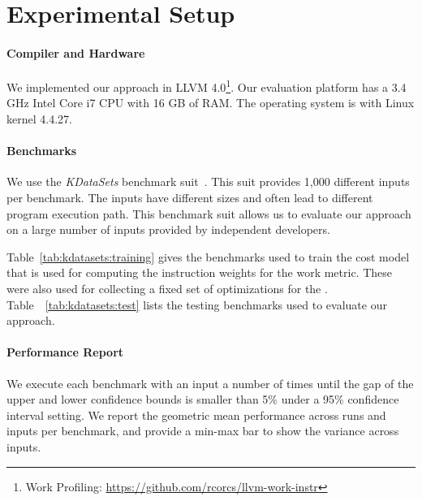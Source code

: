 \section{Experimental Setup}
\paragraph{Compiler and Hardware} We implemented our approach in LLVM 4.0\footnote{Work Profiling: \url{https://github.com/rcorcs/llvm-work-instr}}. Our evaluation platform has a  3.4 GHz Intel Core i7 CPU with 16 GB of RAM. The
operating system is  with Linux kernel 4.4.27.


\paragraph{Benchmarks}
We use the \textit{KDataSets} benchmark suit~\cite{chen10,chen12a}. This suit provides 1,000 different inputs per benchmark. The inputs
have different sizes and often lead to different program execution path.
This benchmark suit allows us to evaluate our approach on a large number of inputs provided by independent
developers.



Table~\ref{tab:kdatasets:training} gives the benchmarks used to train the cost model that is used for computing the instruction weights for
the work metric. These were also used for collecting a fixed set of optimizations for the {\itercomp}. Table~~\ref{tab:kdatasets:test}
lists the testing benchmarks used to evaluate our approach.


\paragraph{Performance Report}
We execute each benchmark with an input a number of times until the gap of the upper and lower confidence bounds is smaller than 5\% under
a 95\% confidence interval setting. We report the geometric mean performance across runs and inputs per benchmark, and provide a min-max
bar to show the variance across inputs.


